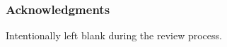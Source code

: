 \documentclass{article} %
\newcommand{\1}{\b{1}}              %
\newcommand{\0}{\b{0}}              %
\newcommand{\todo}[1]{{\color[rgb]{.6,.1,.6}{#1}}}
\begin{document}






\subsubsection*{Acknowledgments}
Intentionally left blank during the review process.



\end{document}

